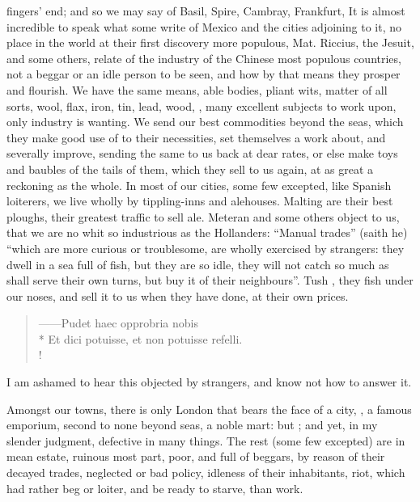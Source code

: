 fingers' end; and so we may say of Basil, Spire, Cambray, Frankfurt, \etc{} It
is almost incredible to speak what some write of Mexico and the cities
adjoining to it, no place in the world at their first discovery more populous,
Mat. Riccius, the Jesuit, and some others, relate of the
industry of the Chinese most populous countries, not a beggar or an idle person
to be seen, and how by that means they prosper and flourish. We have the same
means, able bodies, pliant wits, matter of all sorts, wool, flax, iron, tin,
lead, wood, \etc{}, many excellent subjects to work upon, only industry is
wanting. We send our best commodities beyond the seas, which they make good use
of to their necessities, set themselves a work about, and severally improve,
sending the same to us back at dear rates, or else make toys and baubles of the
tails of them, which they sell to us again, at as great a reckoning as the
whole. In most of our cities, some few excepted, like
Spanish loiterers, we live wholly by tippling-inns and
alehouses. Malting are their best ploughs, their greatest traffic to sell ale.
Meteran and some others object to us, that we are no whit
so industrious as the Hollanders: \enquote{Manual trades} (saith he) \enquote{which are more
curious or troublesome, are wholly exercised by strangers: they dwell in a sea
full of fish, but they are so idle, they will not catch so much as shall serve
their own turns, but buy it of their neighbours}. Tush
, they fish under our noses, and sell it
to us when they have done, at their own prices.

\begin{latin}
\begin{verse}%
------Pudet haec opprobria nobis\\*
Et dici potuisse, et non potuisse refelli.\\!
\end{verse}%
\end{latin}

I am ashamed to hear this objected by strangers, and know not how to answer it.

Amongst our towns, there is only London that bears the face
of a city, , a famous emporium,
second to none beyond seas, a noble mart: but ; and yet, in my slender judgment, defective in many things. The rest
(some few excepted) are in mean estate, ruinous most part,
poor, and full of beggars, by reason of their decayed trades, neglected or bad
policy, idleness of their inhabitants, riot, which had rather beg or loiter,
and be ready to starve, than work.

